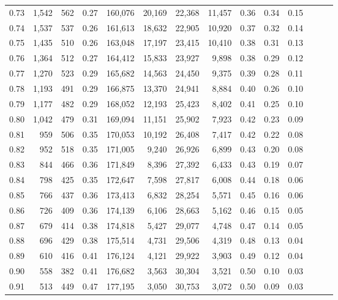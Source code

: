 \begin{tabular}{rrrrrrrrrrrrrr}
0.73 &  1,542 &  562 &  0.27 &  160,076 &   20,169 &  22,368 &  11,457 &  0.36 &  0.34 &      0.15 \\
0.74 &  1,537 &  537 &  0.26 &  161,613 &   18,632 &  22,905 &  10,920 &  0.37 &  0.32 &      0.14 \\
0.75 &  1,435 &  510 &  0.26 &  163,048 &   17,197 &  23,415 &  10,410 &  0.38 &  0.31 &      0.13 \\
0.76 &  1,364 &  512 &  0.27 &  164,412 &   15,833 &  23,927 &   9,898 &  0.38 &  0.29 &      0.12 \\
0.77 &  1,270 &  523 &  0.29 &  165,682 &   14,563 &  24,450 &   9,375 &  0.39 &  0.28 &      0.11 \\
0.78 &  1,193 &  491 &  0.29 &  166,875 &   13,370 &  24,941 &   8,884 &  0.40 &  0.26 &      0.10 \\
0.79 &  1,177 &  482 &  0.29 &  168,052 &   12,193 &  25,423 &   8,402 &  0.41 &  0.25 &      0.10 \\
0.80 &  1,042 &  479 &  0.31 &  169,094 &   11,151 &  25,902 &   7,923 &  0.42 &  0.23 &      0.09 \\
0.81 &    959 &  506 &  0.35 &  170,053 &   10,192 &  26,408 &   7,417 &  0.42 &  0.22 &      0.08 \\
0.82 &    952 &  518 &  0.35 &  171,005 &    9,240 &  26,926 &   6,899 &  0.43 &  0.20 &      0.08 \\
0.83 &    844 &  466 &  0.36 &  171,849 &    8,396 &  27,392 &   6,433 &  0.43 &  0.19 &      0.07 \\
0.84 &    798 &  425 &  0.35 &  172,647 &    7,598 &  27,817 &   6,008 &  0.44 &  0.18 &      0.06 \\
0.85 &    766 &  437 &  0.36 &  173,413 &    6,832 &  28,254 &   5,571 &  0.45 &  0.16 &      0.06 \\
0.86 &    726 &  409 &  0.36 &  174,139 &    6,106 &  28,663 &   5,162 &  0.46 &  0.15 &      0.05 \\
0.87 &    679 &  414 &  0.38 &  174,818 &    5,427 &  29,077 &   4,748 &  0.47 &  0.14 &      0.05 \\
0.88 &    696 &  429 &  0.38 &  175,514 &    4,731 &  29,506 &   4,319 &  0.48 &  0.13 &      0.04 \\
0.89 &    610 &  416 &  0.41 &  176,124 &    4,121 &  29,922 &   3,903 &  0.49 &  0.12 &      0.04 \\
0.90 &    558 &  382 &  0.41 &  176,682 &    3,563 &  30,304 &   3,521 &  0.50 &  0.10 &      0.03 \\
0.91 &    513 &  449 &  0.47 &  177,195 &    3,050 &  30,753 &   3,072 &  0.50 &  0.09 &      0.03 \\

\end{tabular}
